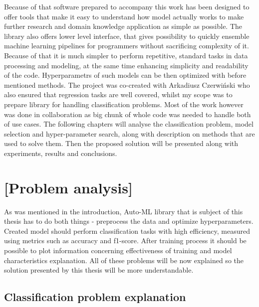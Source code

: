 \documentclass[a4paper,twoside,12pt]{book}
\begin{document}
\begin{itemize}
Because of that software prepared to accompany this work has been designed to offer tools that make it easy to understand how model actually works to  make further research and domain knowledge application as simple as possible.
The library also offers lower level interface, that gives possibility to quickly ensemble machine learning pipelines for programmers without sacrificing complexity of it. Because of that it is much simpler to perform repetitive, standard tasks in data processing and modeling, at the same time enhancing simplicity and readability of the code. Hyperparametrs of such models can be then optimized with before mentioned methods.
The project was co-created with Arkadiusz Czerwiński who also ensured that regression tasks are well covered, whilst my scope was to prepare library for handling classification problems. Most of the work however was done in collaboration as big chunk of whole code was needed to handle both of use cases. The following chapters will analyse the classification problem, model selection and hyper-parameter search, along with description on methods that are used to solve them. Then the proposed solution will be presented along with experiments, results and conclusions.


\end{itemize}

\chapter{[Problem analysis]}

As was mentioned in the introduction, Auto-ML library that is subject of this thesis has to do both things - preprocess the data and optimize hyperparameters. Created model should perform classification tasks with high efficiency, measured using metrics such as accuracy and f1-score.
After training process it should be possible to plot information concerning effectiveness of training and model characteristics explanation.
All of these problems will be now explained so the solution presented by this thesis will be more understandable.

\section{Classification problem explanation}
\end{document}
